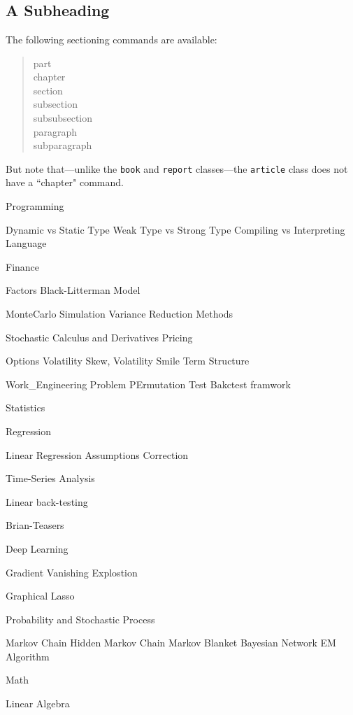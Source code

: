 \documentclass[11pt, openany]{book}              %
\begin{document}
\chapter{}
 
\section{A Subheading}                  %
The following sectioning commands are available:
\begin{quote}                           %
 part \\                                %
 chapter \\                             %
 section \\ 
 subsection \\ 
 subsubsection \\ 
 paragraph \\ 
 subparagraph 
\end{quote}                             %
But note that---unlike the \texttt{book} and \texttt{report} classes---the
\texttt{article} class does not have a ``chapter" command.



Programming

Dynamic vs Static Type
Weak Type vs Strong Type
Compiling vs Interpreting Language


Finance

Factors
Black-Litterman Model 

MonteCarlo Simulation
Variance Reduction Methods 


Stochastic Calculus and Derivatives Pricing

Options
Volatility Skew, Volatility Smile 
Term Structure 

Work_Engineering Problem
PErmutation Test
Bakctest framwork 




Statistics

Regression

Linear Regression Assumptions Correction

Time-Series Analysis

Linear back-testing 

Brian-Teasers

Deep Learning

Gradient Vanishing Explostion 


Graphical Lasso 

Probability and Stochastic Process 

Markov Chain
Hidden Markov Chain
Markov Blanket
Bayesian Network
EM Algorithm

Math

Linear Algebra



 
\end{document}
